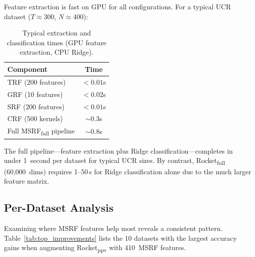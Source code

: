 \documentclass{article}
\begin{document}
Feature extraction is fast on GPU for all configurations.
For a typical UCR dataset ($T{\approx}300$, $N{\approx}400$):

\begin{table}[h]
  \caption{Typical extraction and classification times (GPU feature extraction, CPU Ridge).}
  \label{tab:timing}
  \centering
  \small
  \begin{tabular}{@{}lc@{}}
    \toprule
    Component & Time \\
    \midrule
    TRF (200 features) & ${<}0.01$s \\
    GRF (10 features) & ${<}0.02$s \\
    SRF (200 features) & ${<}0.01$s \\
    CRF (500 kernels) & ${\sim}0.3$s \\
    Full MSRF\textsubscript{full} pipeline & ${\sim}0.8$s \\
    \bottomrule
  \end{tabular}
\end{table}

The full pipeline---feature extraction plus Ridge classification---completes in under 1~second per dataset for typical UCR sizes.
By contrast, Rocket\textsubscript{full} (60{,}000~dims) requires 1--50\,s for Ridge classification alone due to the much larger feature matrix.

\subsection{Per-Dataset Analysis}

Examining where MSRF features help most reveals a consistent pattern.
Table~\ref{tab:top_improvements} lists the 10 datasets with the largest accuracy gains when augmenting Rocket\textsubscript{ppv} with 410~MSRF features.
\end{document}
